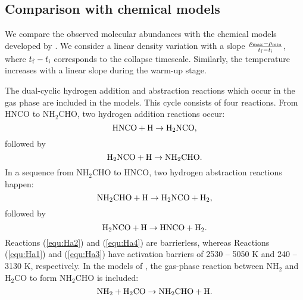 \documentclass[twocolumn, twocolappendix]{aastex631}
\begin{document}
\subsection{Comparison with chemical models} \label{sec:d3}

We compare the observed molecular abundances with the chemical models developed by \citet{2020ApJ...895...86G}.
We consider a linear density variation with a slope $\frac{\rho_{\rm {max}} - \rho_{\rm {min}}}{t_{\rm {f}}-t_{\rm {i}}}$, where $t_{\rm {f}}-t_{\rm {i}}$ corresponds to the collapse timescale.
Similarly, the temperature increases with a linear slope during the warm-up stage.

The dual-cyclic hydrogen addition and abstraction reactions \citep{Haupa...2019} which occur in the gas phase are included in the models.
This cycle consists of four reactions.
From HNCO to NH$_{2}$CHO, two hydrogen addition reactions occur:
\begin{equation} \label{equ:Ha1}
{\rm {HNCO}} + {\rm {H}} \rightarrow  {\rm {H}}_2{\rm {NCO}},
\end{equation} 
followed by
\begin{equation} \label{equ:Ha2}
{\rm {H}}_2{\rm {NCO}} + {\rm {H}} \rightarrow  {\rm {NH}}_2{\rm {CHO}}.
\end{equation} 
In a sequence from NH$_{2}$CHO to HNCO, two hydrogen abstraction reactions happen:
\begin{equation} \label{equ:Ha3}
{\rm {NH}}_2{\rm {CHO}} + {\rm {H}} \rightarrow  {\rm {H}}_2{\rm {NCO}} + {\rm {H}}_{2},
\end{equation} 
followed by
\begin{equation} \label{equ:Ha4}
{\rm {H}}_2{\rm {NCO}} + {\rm {H}} \rightarrow  {\rm {HNCO}}+ {\rm {H}}_{2}.
\end{equation} 
Reactions (\ref{equ:Ha2}) and (\ref{equ:Ha4}) are barrierless, whereas Reactions (\ref{equ:Ha1}) and (\ref{equ:Ha3}) have activation barriers of 2530 -- 5050 K and 240 -- 3130 K, respectively. %
In the models of \citet{2020ApJ...895...86G}, the gas-phase reaction between NH$_{2}$ and H$_{2}$CO to form NH$_{2}$CHO is included:
\begin{equation} \label{equ:H2CO}
{\rm {NH}}_2+{\rm {H}}_2{\rm {CO}} \rightarrow  {\rm {NH}}_2{\rm {CHO}} + {\rm {H}}.
\end{equation}
\end{document}
